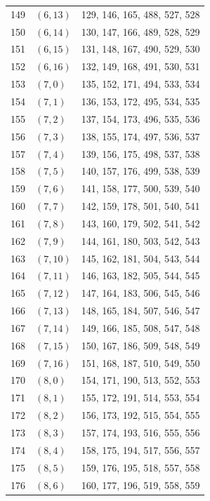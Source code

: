 \documentclass{article}
\begin{document}
\begin{longtable}{lll}
  149 & \((6, 13)\) & 129, 146, 165, 488, 527, 528 \\
  150 & \((6, 14)\) & 130, 147, 166, 489, 528, 529 \\
  151 & \((6, 15)\) & 131, 148, 167, 490, 529, 530 \\
  152 & \((6, 16)\) & 132, 149, 168, 491, 530, 531 \\
  153 & \((7, 0)\) & 135, 152, 171, 494, 533, 534 \\
  154 & \((7, 1)\) & 136, 153, 172, 495, 534, 535 \\
  155 & \((7, 2)\) & 137, 154, 173, 496, 535, 536 \\
  156 & \((7, 3)\) & 138, 155, 174, 497, 536, 537 \\
  157 & \((7, 4)\) & 139, 156, 175, 498, 537, 538 \\
  158 & \((7, 5)\) & 140, 157, 176, 499, 538, 539 \\
  159 & \((7, 6)\) & 141, 158, 177, 500, 539, 540 \\
  160 & \((7, 7)\) & 142, 159, 178, 501, 540, 541 \\
  161 & \((7, 8)\) & 143, 160, 179, 502, 541, 542 \\
  162 & \((7, 9)\) & 144, 161, 180, 503, 542, 543 \\
  163 & \((7, 10)\) & 145, 162, 181, 504, 543, 544 \\
  164 & \((7, 11)\) & 146, 163, 182, 505, 544, 545 \\
  165 & \((7, 12)\) & 147, 164, 183, 506, 545, 546 \\
  166 & \((7, 13)\) & 148, 165, 184, 507, 546, 547 \\
  167 & \((7, 14)\) & 149, 166, 185, 508, 547, 548 \\
  168 & \((7, 15)\) & 150, 167, 186, 509, 548, 549 \\
  169 & \((7, 16)\) & 151, 168, 187, 510, 549, 550 \\
  170 & \((8, 0)\) & 154, 171, 190, 513, 552, 553 \\
  171 & \((8, 1)\) & 155, 172, 191, 514, 553, 554 \\
  172 & \((8, 2)\) & 156, 173, 192, 515, 554, 555 \\
  173 & \((8, 3)\) & 157, 174, 193, 516, 555, 556 \\
  174 & \((8, 4)\) & 158, 175, 194, 517, 556, 557 \\
  175 & \((8, 5)\) & 159, 176, 195, 518, 557, 558 \\
  176 & \((8, 6)\) & 160, 177, 196, 519, 558, 559 \\

\end{longtable}
\end{document}
